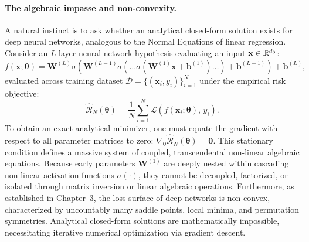 \paragraph{The algebraic impasse and non-convexity.}
A natural instinct is to ask whether an analytical closed-form solution exists for deep neural networks, analogous to the Normal Equations of linear regression. Consider an $L$-layer neural network hypothesis evaluating an input $\mathbf{x} \in \mathbb{R}^{d_0}$:
\begin{equation}
f(\mathbf{x}; \boldsymbol{\theta}) = \mathbf{W}^{(L)} \sigma\left( \mathbf{W}^{(L-1)} \sigma\left( \dots \sigma\left( \mathbf{W}^{(1)} \mathbf{x} + \mathbf{b}^{(1)} \right) \dots \right) + \mathbf{b}^{(L-1)} \right) + \mathbf{b}^{(L)},
\label{eq:deep_composition_hypothesis}
\end{equation}
evaluated across training dataset $\mathcal{D} = \{(\mathbf{x}_i, y_i)\}_{i=1}^N$ under the empirical risk objective:
\begin{equation}
\hat{\mathcal{R}}_N(\boldsymbol{\theta}) = \frac{1}{N} \sum_{i=1}^N \mathcal{L}\left( f(\mathbf{x}_i; \boldsymbol{\theta}), \, y_i \right).
\end{equation}
To obtain an exact analytical minimizer, one must equate the gradient with respect to all parameter matrices to zero: $\nabla_{\boldsymbol{\theta}} \hat{\mathcal{R}}_N(\boldsymbol{\theta}) = \mathbf{0}$. This stationary condition defines a massive system of coupled, transcendental non-linear algebraic equations. Because early parameters $\mathbf{W}^{(1)}$ are deeply nested within cascading non-linear activation functions $\sigma(\cdot)$, they cannot be decoupled, factorized, or isolated through matrix inversion or linear algebraic operations. Furthermore, as established in Chapter~3, the loss surface of deep networks is non-convex, characterized by uncountably many saddle points, local minima, and permutation symmetries. Analytical closed-form solutions are mathematically impossible, necessitating iterative numerical optimization via gradient descent.

